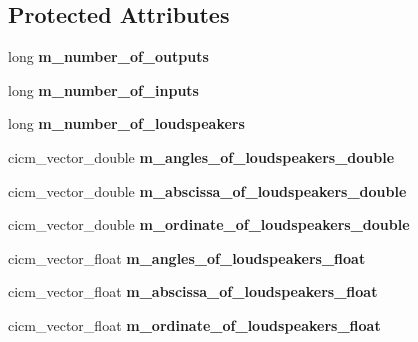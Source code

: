 \subsection*{Protected Attributes}
\begin{DoxyCompactItemize}
\item 
\hypertarget{class_planewaves_a6dd0098ff1d4b81527c6167466297058}{long {\bfseries m\-\_\-number\-\_\-of\-\_\-outputs}}\label{class_planewaves_a6dd0098ff1d4b81527c6167466297058}

\item 
\hypertarget{class_planewaves_acda1374f626a0bc8195168dd1fe19b70}{long {\bfseries m\-\_\-number\-\_\-of\-\_\-inputs}}\label{class_planewaves_acda1374f626a0bc8195168dd1fe19b70}

\item 
\hypertarget{class_planewaves_aa7abe82cc58b3565ed1a28a2474eb32d}{long {\bfseries m\-\_\-number\-\_\-of\-\_\-loudspeakers}}\label{class_planewaves_aa7abe82cc58b3565ed1a28a2474eb32d}

\item 
\hypertarget{class_planewaves_afe5fc340f74dda877171778d9f6a3679}{cicm\-\_\-vector\-\_\-double {\bfseries m\-\_\-angles\-\_\-of\-\_\-loudspeakers\-\_\-double}}\label{class_planewaves_afe5fc340f74dda877171778d9f6a3679}

\item 
\hypertarget{class_planewaves_ade92d829ba7007329da4bcbaab89dadc}{cicm\-\_\-vector\-\_\-double {\bfseries m\-\_\-abscissa\-\_\-of\-\_\-loudspeakers\-\_\-double}}\label{class_planewaves_ade92d829ba7007329da4bcbaab89dadc}

\item 
\hypertarget{class_planewaves_ab9ad4e534d97062c547bd9f95fe169e6}{cicm\-\_\-vector\-\_\-double {\bfseries m\-\_\-ordinate\-\_\-of\-\_\-loudspeakers\-\_\-double}}\label{class_planewaves_ab9ad4e534d97062c547bd9f95fe169e6}

\item 
\hypertarget{class_planewaves_a0a696e0b2346571f07c820236b99070d}{cicm\-\_\-vector\-\_\-float {\bfseries m\-\_\-angles\-\_\-of\-\_\-loudspeakers\-\_\-float}}\label{class_planewaves_a0a696e0b2346571f07c820236b99070d}

\item 
\hypertarget{class_planewaves_a09dcfc8c5af875db858a37530e270e0d}{cicm\-\_\-vector\-\_\-float {\bfseries m\-\_\-abscissa\-\_\-of\-\_\-loudspeakers\-\_\-float}}\label{class_planewaves_a09dcfc8c5af875db858a37530e270e0d}

\item 
\hypertarget{class_planewaves_a921b48fb8846a90112ca7d1799a12186}{cicm\-\_\-vector\-\_\-float {\bfseries m\-\_\-ordinate\-\_\-of\-\_\-loudspeakers\-\_\-float}}\label{class_planewaves_a921b48fb8846a90112ca7d1799a12186}


\end{DoxyCompactItemize}
